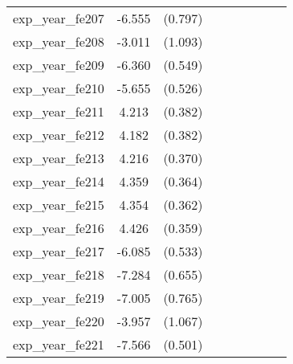 {\begin{tabular}{l*{4}{cc}}
exp\_year\_fe207&   -6.555\sym{***}&  (0.797)&                  &         &                  &         &                  &         \\
exp\_year\_fe208&   -3.011\sym{**} &  (1.093)&                  &         &                  &         &                  &         \\
exp\_year\_fe209&   -6.360\sym{***}&  (0.549)&                  &         &                  &         &                  &         \\
exp\_year\_fe210&   -5.655\sym{***}&  (0.526)&                  &         &                  &         &                  &         \\
exp\_year\_fe211&    4.213\sym{***}&  (0.382)&                  &         &                  &         &                  &         \\
exp\_year\_fe212&    4.182\sym{***}&  (0.382)&                  &         &                  &         &                  &         \\
exp\_year\_fe213&    4.216\sym{***}&  (0.370)&                  &         &                  &         &                  &         \\
exp\_year\_fe214&    4.359\sym{***}&  (0.364)&                  &         &                  &         &                  &         \\
exp\_year\_fe215&    4.354\sym{***}&  (0.362)&                  &         &                  &         &                  &         \\
exp\_year\_fe216&    4.426\sym{***}&  (0.359)&                  &         &                  &         &                  &         \\
exp\_year\_fe217&   -6.085\sym{***}&  (0.533)&                  &         &                  &         &                  &         \\
exp\_year\_fe218&   -7.284\sym{***}&  (0.655)&                  &         &                  &         &                  &         \\
exp\_year\_fe219&   -7.005\sym{***}&  (0.765)&                  &         &                  &         &                  &         \\
exp\_year\_fe220&   -3.957\sym{***}&  (1.067)&                  &         &                  &         &                  &         \\
exp\_year\_fe221&   -7.566\sym{***}&  (0.501)&                  &         &                  &         &                  &         \\

\end{tabular}}
